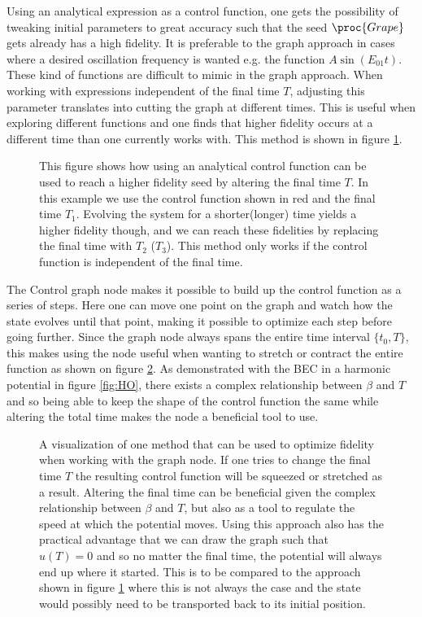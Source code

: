 \documentclass[aps,pra,reprint,superscriptaddress]{revtex4-1}
\begin{document}
Using an analytical expression as a control function, one gets the possibility of tweaking initial parameters to great accuracy such that the seed $\proc{Grape}$ gets already has a high fidelity. It is preferable to the graph approach in cases where a desired oscillation frequency is wanted e.g. the function $A\sin(E_{01}t)$. These kind of functions are difficult to mimic in the graph approach. When working with expressions independent of the final time $T$, adjusting this parameter translates into cutting the graph at different times. This is useful when exploring different functions and one finds that higher fidelity occurs at a different time than one currently works with. This method is shown in figure \ref{fig:funcAppr}. \\
\begin{figure}
	\def\svgwidth{\columnwidth}
	
	\caption{This figure shows how using an analytical control function can be used to reach a higher fidelity seed by altering the final time $T$. In this example we use the control function shown in red and the final time $T_1$. Evolving the system for a shorter(longer) time yields a higher fidelity though, and we can reach these fidelities by replacing the final time with $T_2$ ($T_3$). This method only works if the control function is independent of the final time.}
	\label{fig:funcAppr}
\end{figure}

The Control graph node makes it possible to build up the control function as a series of steps. Here one can move one point on the graph and watch how the state evolves until that point, making it possible to optimize each step before going further. Since the graph node always spans the entire time interval $\{t_0,T\}$, this makes using the node useful when wanting to stretch or contract the entire function as shown on figure \ref{fig:graphAppr}. As demonstrated with the BEC in a harmonic potential in figure \ref{fig:HO}, there exists a complex relationship between $\beta$ and $T$ and so being able to keep the shape of the control function the same while altering the total time makes the node a beneficial tool to use.\\

\begin{figure}
	\def\svgwidth{\columnwidth}
	
	\caption{A visualization of one method that can be used to optimize fidelity when working with the graph node. If one tries to change the final time $T$ the resulting control function will be squeezed or stretched as a result. Altering the final time can be beneficial given the complex relationship between $\beta$ and $T$, but also as a tool to regulate the speed at which the potential moves. Using this approach also has the practical advantage that we can draw the graph such that $u(T)=0$ and so no matter the final time, the potential will always end up where it started. This is to be compared to the approach shown in figure \ref{fig:funcAppr} where this is not always the case and the state would possibly need to be transported back to its initial position.}
	\label{fig:graphAppr}
\end{figure}
\end{document}
